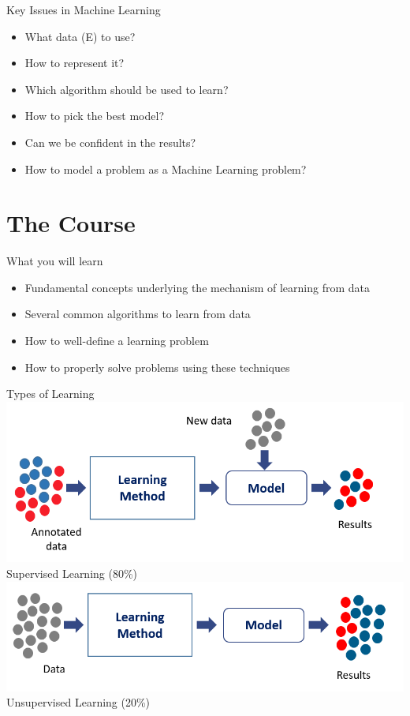 \documentclass[aspectratio=169,10pt]{beamer}
\begin{document}
\begin{frame}{Key Issues in Machine Learning}
	\begin{itemize}
		\item What data (E) to use?
		\item How to represent it?
		\item Which algorithm should be used to learn?
		\item How to pick the best model?
		\item Can we be confident in the results?
		\item How to model a problem as a Machine Learning problem?
\end{itemize}
	
\end{frame}
\section{The Course}
\begin{frame}{What you will learn}
	\begin{itemize}
		\item Fundamental concepts underlying the mechanism of learning from data
		\item Several common algorithms to learn from data
		\item How to well-define a learning problem
		\item 	How to properly solve problems using these techniques
	\end{itemize}
\end{frame}

\begin{frame}{Types of Learning}
	\centering
	\includegraphics[width=0.6\linewidth, clip]{images/supervised}\\
Supervised Learning (80\%)\\
\pause
\vspace{0.2cm}
\includegraphics[width=0.6\linewidth, clip]{images/unsupervised}\\
Unsupervised Learning (20\%)
\end{frame}
\end{document}

